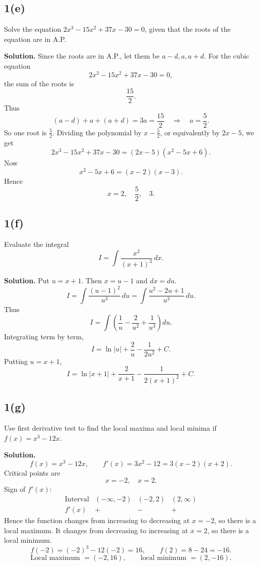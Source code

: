\documentclass[11pt,a4paper]{article}
\newcommand{\ans}{\textbf{Solution.} }
\newcommand{\final}[1]{\[\boxed{#1}\]}
\begin{document}
\subsection*{1(e)}
\begin{questionbox}
Solve the equation $2x^3-15x^2+37x-30=0$, given that the roots of the equation are in A.P.
\end{questionbox}
\ans
Since the roots are in A.P., let them be $a-d,a,a+d$.
For the cubic equation
\[
2x^3-15x^2+37x-30=0,
\]
the sum of the roots is
\[
\frac{15}{2}.
\]
Thus
\[
(a-d)+a+(a+d)=3a=\frac{15}{2}
\quad\Rightarrow\quad
 a=\frac{5}{2}.
\]
So one root is $\frac{5}{2}$. Dividing the polynomial by $x-\frac{5}{2}$, or equivalently by $2x-5$, we get
\[
2x^3-15x^2+37x-30=(2x-5)(x^2-5x+6).
\]
Now
\[
x^2-5x+6=(x-2)(x-3).
\]
Hence
\final{x=2,\quad \frac{5}{2},\quad 3.}

\subsection*{1(f)}
\begin{questionbox}
Evaluate the integral
\[
I=\int \frac{x^2}{(x+1)^3}\,dx.
\]
\end{questionbox}
\ans
Put $u=x+1$. Then $x=u-1$ and $dx=du$.
\[
I=\int \frac{(u-1)^2}{u^3}\,du
=\int \frac{u^2-2u+1}{u^3}\,du.
\]
Thus
\[
I=\int\left(\frac1u-\frac{2}{u^2}+\frac1{u^3}\right)du.
\]
Integrating term by term,
\[
I=\ln|u|+\frac{2}{u}-\frac{1}{2u^2}+C.
\]
Putting $u=x+1$,
\final{I=\ln|x+1|+\frac{2}{x+1}-\frac{1}{2(x+1)^2}+C.}

\subsection*{1(g)}
\begin{questionbox}
Use first derivative test to find the local maxima and local minima if $f(x)=x^3-12x$.
\end{questionbox}
\ans
\[
f(x)=x^3-12x,
\qquad
f'(x)=3x^2-12=3(x-2)(x+2).
\]
Critical points are
\[
x=-2,\quad x=2.
\]
Sign of $f'(x)$:
\[
\begin{array}{c|ccc}
\text{Interval} & (-\infty,-2)&(-2,2)&(2,\infty)\\\hline
f'(x)&+&-&+
\end{array}
\]
Hence the function changes from increasing to decreasing at $x=-2$, so there is a local maximum.
It changes from decreasing to increasing at $x=2$, so there is a local minimum.
\[
f(-2)=(-2)^3-12(-2)=16,
\qquad
f(2)=8-24=-16.
\]
\final{\text{Local maximum }=(-2,16),\qquad \text{local minimum }=(2,-16).}
\end{document}
